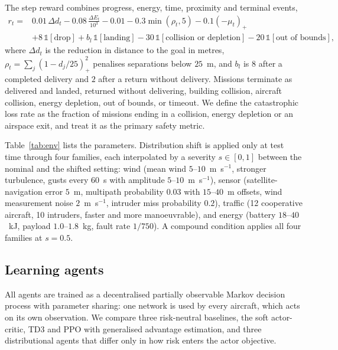 The step reward combines progress, energy, time, proximity and terminal events,
\begin{equation}
\begin{split}
r_t = {}& 0.01\,\Delta d_t - 0.08\,\frac{\Delta E_t}{10^3} - 0.01 - 0.3\min(\rho_t,5) - 0.1(-\mu_t)_+ \\
& + 8\,\mathbb{1}[\text{drop}] + b_l\,\mathbb{1}[\text{landing}] - 30\,\mathbb{1}[\text{collision or depletion}] - 20\,\mathbb{1}[\text{out of bounds}],
\end{split}
\label{eq:reward}
\end{equation}
where $\Delta d_t$ is the reduction in distance to the goal in metres, $\rho_t=\sum_j (1-d_j/25)^2_+$ penalises separations below $25$~m, and $b_l$ is $8$ after a completed delivery and $2$ after a return without delivery. Missions terminate as delivered and landed, returned without delivering, building collision, aircraft collision, energy depletion, out of bounds, or timeout. We define the catastrophic loss rate as the fraction of missions ending in a collision, energy depletion or an airspace exit, and treat it as the primary safety metric.

Table~\ref{tab:env} lists the parameters. Distribution shift is applied only at test time through four families, each interpolated by a severity $s\in[0,1]$ between the nominal and the shifted setting: wind (mean wind $5$--$10$~m~s$^{-1}$, stronger turbulence, gusts every $60$~s with amplitude $5$--$10$~m~s$^{-1}$), sensor (satellite-navigation error $5$~m, multipath probability $0.03$ with $15$--$40$~m offsets, wind measurement noise $2$~m~s$^{-1}$, intruder miss probability $0.2$), traffic (12 cooperative aircraft, 10 intruders, faster and more manoeuvrable), and energy (battery $18$--$40$~kJ, payload $1.0$--$1.8$~kg, fault rate $1/750$). A compound condition applies all four families at $s=0.5$.

\subsection*{Learning agents}

All agents are trained as a decentralised partially observable Markov decision process with parameter sharing: one network is used by every aircraft, which acts on its own observation. We compare three risk-neutral baselines, the soft actor-critic\cite{haarnoja2018sac}, TD3\cite{fujimoto2018td3} and PPO with generalised advantage estimation\cite{schulman2017ppo,schulman2016gae}, and three distributional agents that differ only in how risk enters the actor objective.


